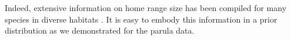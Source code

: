 Indeed, extensive information on home range size has
been compiled for many species in diverse habitats %
\citep[\emph{e.g.},][]{degraaf_yamasaki:2001}. It is
easy to embody this information in a prior distribution as we
demonstrated for the parula data.

